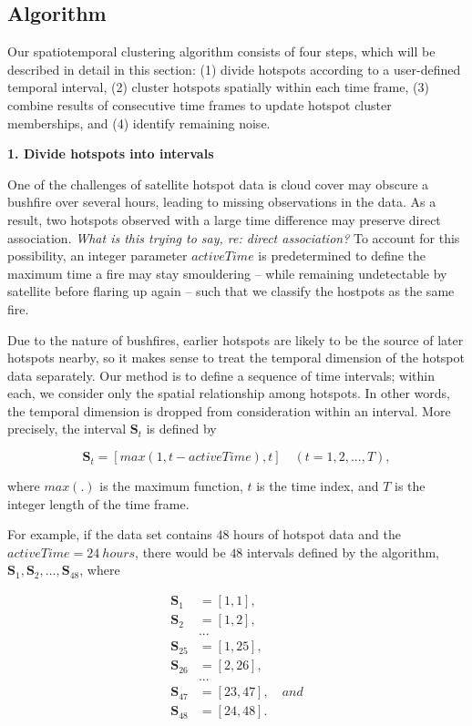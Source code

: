 \hypertarget{algorithm}{%
\subsection{Algorithm}\label{algorithm}}

Our spatiotemporal clustering algorithm consists of four steps, which
will be described in detail in this section: (1) divide hotspots
according to a user-defined temporal interval, (2) cluster hotspots
spatially within each time frame, (3) combine results of consecutive
time frames to update hotspot cluster memberships, and (4) identify
remaining noise.

\textbf{1. Divide hotspots into intervals}

One of the challenges of satellite hotspot data is cloud cover may
obscure a bushfire over several hours, leading to missing observations
in the data. As a result, two hotspots observed with a large time
difference may preserve direct association.
\textit{What is this trying to say, re: direct association?} To account
for this possibility, an integer parameter \(activeTime\) is
predetermined to define the maximum time a fire may stay smouldering --
while remaining undetectable by satellite before flaring up again --
such that we classify the hostpots as the same fire.

Due to the nature of bushfires, earlier hotspots are likely to be the
source of later hotspots nearby, so it makes sense to treat the temporal
dimension of the hotspot data separately. Our method is to define a
sequence of time intervals; within each, we consider only the spatial
relationship among hotspots. In other words, the temporal dimension is
dropped from consideration within an interval. More precisely, the
interval \(\boldsymbol{S}_t\) is defined by

\[\boldsymbol{S}_t = [max(1,t-activeTime),t]\quad(t = 1,2,...,T),\]

where \(max(.)\) is the maximum function, \(t\) is the time index, and
\(T\) is the integer length of the time frame.

For example, if the data set contains \(48\) hours of hotspot data and
the \(activeTime = 24~hours\), there would be \(48\) intervals defined
by the algorithm,
\(\boldsymbol{S}_1,\boldsymbol{S}_2,\ldots,\boldsymbol{S}_{48}\), where

\begin{align*}
\boldsymbol{S}_1 &= [1,1],\\
\boldsymbol{S}_2 &= [1,2],\\
&...\\
\boldsymbol{S}_{25} &= [1,25],\\
\boldsymbol{S}_{26} &= [2,26],\\
&...\\
\boldsymbol{S}_{47} &= [23,47], \quad and\\
\boldsymbol{S}_{48} &= [24,48].
\end{align*}

